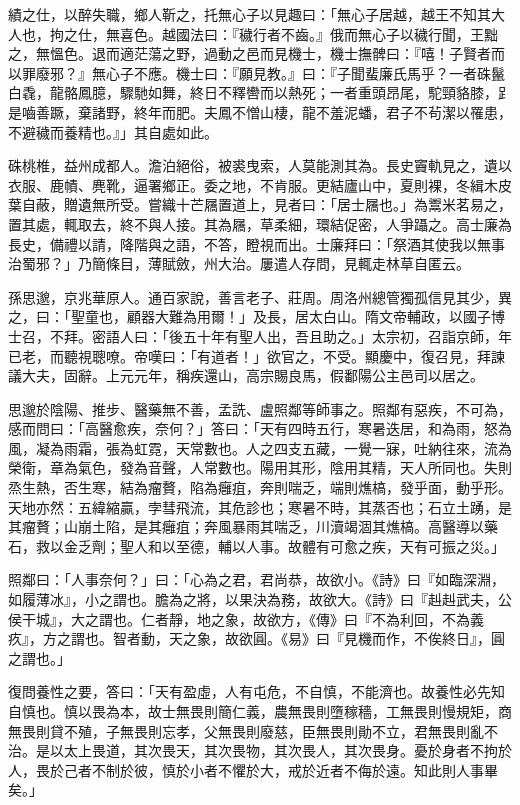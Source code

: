 \begin{pinyinscope}
 績之仕，以醉失職，鄉人靳之，托無心子以見趣曰：「無心子居越，越王不知其大人也，拘之仕，無喜色。越國法曰：『穢行者不齒。』俄而無心子以穢行聞，王黜之，無慍色。退而適茫蕩之野，過動之邑而見機士，機士撫髀曰：『嘻！子賢者而以罪廢邪？』無心子不應。機士曰：『願見教。』曰：『子聞蜚廉氏馬乎？一者硃鬣白毳，龍骼鳳臆，驟馳如舞，終日不釋轡而以熱死；一者重頭昂尾，駝頸貉膝，𧾷是嚙善蹶，棄諸野，終年而肥。夫鳳不憎山棲，龍不羞泥蟠，君子不茍潔以罹患，不避穢而養精也。』」其自處如此。



 硃桃椎，益州成都人。澹泊絕俗，被裘曳索，人莫能測其為。長史竇軌見之，遺以衣服、鹿幘、麂靴，逼署鄉正。委之地，不肯服。更結廬山中，夏則裸，冬緝木皮葉自蔽，贈遺無所受。嘗織十芒屩置道上，見者曰：「居士屩也。」為鬻米茗易之，置其處，輒取去，終不與人接。其為屩，草柔細，環結促密，人爭躡之。高士廉為長史，備禮以請，降階與之語，不答，瞪視而出。士廉拜曰：「祭酒其使我以無事治蜀邪？」乃簡條目，薄賦斂，州大治。屢遣人存問，見輒走林草自匿云。



 孫思邈，京兆華原人。通百家說，善言老子、莊周。周洛州總管獨孤信見其少，異之，曰：「聖童也，顧器大難為用爾！」及長，居太白山。隋文帝輔政，以國子博士召，不拜。密語人曰：「後五十年有聖人出，吾且助之。」太宗初，召詣京師，年已老，而聽視聰嘹。帝嘆曰：「有道者！」欲官之，不受。顯慶中，復召見，拜諫議大夫，固辭。上元元年，稱疾還山，高宗賜良馬，假鄱陽公主邑司以居之。



 思邈於陰陽、推步、醫藥無不善，孟詵、盧照鄰等師事之。照鄰有惡疾，不可為，感而問曰：「高醫愈疾，奈何？」答曰：「天有四時五行，寒暑迭居，和為雨，怒為風，凝為雨霜，張為虹霓，天常數也。人之四支五藏，一覺一寐，吐納往來，流為榮衛，章為氣色，發為音聲，人常數也。陽用其形，陰用其精，天人所同也。失則烝生熱，否生寒，結為瘤贅，陷為癰疽，奔則喘乏，端則燋槁，發乎面，動乎形。天地亦然：五緯縮贏，孛彗飛流，其危診也；寒暑不時，其蒸否也；石立土踴，是其瘤贅；山崩土陷，是其癰疽；奔風暴雨其喘乏，川瀆竭涸其燋槁。高醫導以藥石，救以金乏劑；聖人和以至德，輔以人事。故體有可愈之疾，天有可振之災。」



 照鄰曰：「人事奈何？」曰：「心為之君，君尚恭，故欲小。《詩》曰『如臨深淵，如履薄冰』，小之謂也。膽為之將，以果決為務，故欲大。《詩》曰『赳赳武夫，公侯干城』，大之謂也。仁者靜，地之象，故欲方，《傳》曰『不為利回，不為義疚』，方之謂也。智者動，天之象，故欲圓。《易》曰『見機而作，不俟終日』，圓之謂也。」



 復問養性之要，答曰：「天有盈虛，人有屯危，不自慎，不能濟也。故養性必先知自慎也。慎以畏為本，故士無畏則簡仁義，農無畏則墮稼穡，工無畏則慢規矩，商無畏則貸不殖，子無畏則忘孝，父無畏則廢慈，臣無畏則勛不立，君無畏則亂不治。是以太上畏道，其次畏天，其次畏物，其次畏人，其次畏身。憂於身者不拘於人，畏於己者不制於彼，慎於小者不懼於大，戒於近者不侮於遠。知此則人事畢矣。」




\end{pinyinscope}
